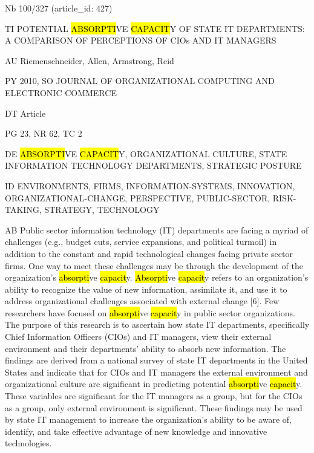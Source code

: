 \documentclass[a4paper]{article}
\begin{document}
\vspace*{-2cm}
Nb \tabto{0cm}100/327 (article\_id: 427)\par
TI \tabto{0cm}POTENTIAL \hl{ABSORPTI}VE \hl{CAPACIT}Y OF STATE IT DEPARTMENTS: A COMPARISON OF PERCEPTIONS OF CIOs AND IT MANAGERS\par
AU \tabto{0cm}Riemenschneider, Allen, Armstrong, Reid\par
PY \tabto{0cm}2010, SO JOURNAL OF ORGANIZATIONAL COMPUTING AND ELECTRONIC COMMERCE\par
DT \tabto{0cm}Article\par
PG \tabto{0cm}23, NR 62, TC 2\par
DE \tabto{0cm}\hl{ABSORPTI}VE \hl{CAPACIT}Y, ORGANIZATIONAL CULTURE, STATE INFORMATION TECHNOLOGY DEPARTMENTS, STRATEGIC POSTURE\par
ID \tabto{0cm}ENVIRONMENTS, FIRMS, INFORMATION-SYSTEMS, INNOVATION, ORGANIZATIONAL-CHANGE, PERSPECTIVE, PUBLIC-SECTOR, RISK-TAKING, STRATEGY, TECHNOLOGY\par
AB \tabto{0cm}Public sector information technology (IT) departments are facing a myriad of challenges (e.g., budget cuts, service expansions, and political turmoil) in addition to the constant and rapid technological changes facing private sector firms. One way to meet these challenges may be through the development of the organization's \hl{absorpti}ve \hl{capacit}y. \hl{Absorpti}ve \hl{capacit}y refers to an organization's ability to recognize the value of new information, assimilate it, and use it to address organizational challenges associated with external change [6]. Few researchers have focused on \hl{absorpti}ve \hl{capacit}y in public sector organizations. The purpose of this research is to ascertain how state IT departments, specifically Chief Information Officers (CIOs) and IT managers, view their external environment and their departments' ability to absorb new information.
The findings are derived from a national survey of state IT departments in the United States and indicate that for CIOs and IT managers the external environment and organizational culture are significant in predicting potential \hl{absorpti}ve \hl{capacit}y. These variables are significant for the IT managers as a group, but for the CIOs as a group, only external environment is significant. These findings may be used by state IT management to increase the organization's ability to be aware of, identify, and take effective advantage of new knowledge and innovative technologies.\par
\clearpage
\end{document}

